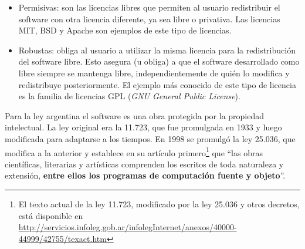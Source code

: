 \begin{itemize}
\item Permisivas: son las licencias libres que permiten al usuario redistribuir el software con otra licencia diferente, ya sea libre o privativa. Las licencias MIT, BSD y Apache son ejemplos de este tipo de licencias.


\item Robustas: obliga al usuario a utilizar la misma licencia para la redistribución del software libre. Esto asegura (u obliga) a que el software desarrollado como libre siempre se mantenga libre, independientemente de quién lo modifica y redistribuye posteriormente. El ejemplo más conocido de este tipo de licencia es la familia de licencias GPL (\emph{GNU General Public License}).
\end{itemize}


Para la ley argentina el software es una obra protegida por la propiedad intelectual. La ley original era la 11.723, que fue promulgada en 1933 y luego modificada para adaptarse a los tiempos. En 1998 se promulgó la ley 25.036, que modifica a la anterior y establece en su artículo primero\footnote{El texto actual de la ley 11.723, modificado por la ley 25.036 y otros decretos, está disponible en \url{http://servicios.infoleg.gob.ar/infolegInternet/anexos/40000-44999/42755/texact.htm}} que ``las obras científicas, literarias y artísticas comprenden los escritos de toda naturaleza y extensión, {\bf entre ellos los programas de computación fuente y objeto}''. 

